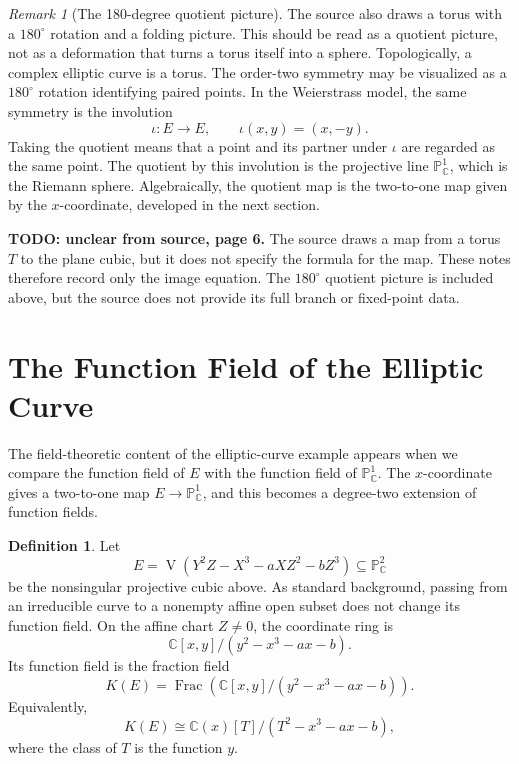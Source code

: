 \documentclass[11pt]{article}
\theoremstyle{definition}
\newtheorem{definition}[theorem]{Definition}
\theoremstyle{remark}
\newtheorem{remark}[theorem]{Remark}
\newcommand{\C}{\mathbb{C}}
\newcommand{\Pj}{\mathbb{P}}
\newcommand{\K}{K}
\newcommand{\V}{\operatorname{V}}
\newcommand{\Frac}{\operatorname{Frac}}
\newcommand{\sourceunclear}[2]{%
  \par\smallskip
  \noindent\textbf{TODO: unclear from source, page #1.} #2
  \par\smallskip
}
\begin{document}
\begin{remark}[The 180-degree quotient picture]
The source also draws a torus with a \(180^\circ\) rotation and a folding
picture.  This should be read as a quotient picture, not as a deformation that
turns a torus itself into a sphere.  Topologically, a complex elliptic curve is
a torus.  The order-two symmetry may be visualized as a \(180^\circ\) rotation
identifying paired points.  In the Weierstrass model, the same symmetry is the
involution
\[
  \iota\colon E\longrightarrow E,
  \qquad
  \iota(x,y)=(x,-y).
\]
Taking the quotient means that a point and its partner under \(\iota\) are
regarded as the same point.  The quotient by this involution is the projective
line \(\Pj^1_{\C}\), which is the Riemann sphere.  Algebraically, the quotient
map is the two-to-one map given by the \(x\)-coordinate, developed in the next
section.
\end{remark}

\sourceunclear{6}{The source draws a map from a torus \(T\) to the plane
cubic, but it does not specify the formula for the map.  These notes therefore
record only the image equation.  The \(180^\circ\) quotient picture is
included above, but the source does not provide its full branch or fixed-point
data.}

\section{The Function Field of the Elliptic Curve}

The field-theoretic content of the elliptic-curve example appears when we
compare the function field of \(E\) with the function field of \(\Pj^1_{\C}\).
The \(x\)-coordinate gives a two-to-one map \(E\to\Pj^1_{\C}\), and this
becomes a degree-two extension of function fields.

\begin{definition}
Let
\[
  E=\V(Y^2Z-X^3-aXZ^2-bZ^3)\subseteq \Pj^2_{\C}
\]
be the nonsingular projective cubic above.  As standard background, passing
from an irreducible curve to a nonempty affine open subset does not change its
function field.  On the affine chart \(Z\neq 0\), the coordinate ring is
\[
  \C[x,y]\big/(y^2-x^3-ax-b).
\]
Its function field is the fraction field
\[
  \K(E)
  =
  \Frac\!\left(\C[x,y]\big/(y^2-x^3-ax-b)\right).
\]
Equivalently,
\[
  \K(E)\cong \C(x)[T]\big/(T^2-x^3-ax-b),
\]
where the class of \(T\) is the function \(y\).
\end{definition}
\end{document}
